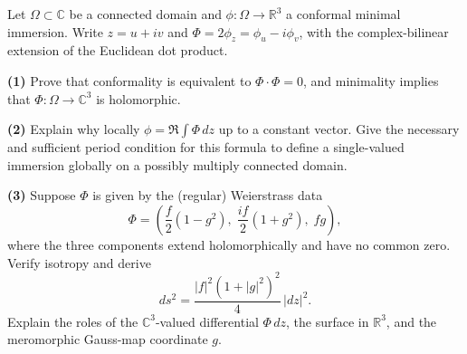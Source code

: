 \begin{problem}[CP-IV-0134]
\label{prob:cp-iv-0134}
Let $\Omega\subset\mathbb C$ be a connected domain and
$\phi:\Omega\to\mathbb R^3$ a conformal minimal immersion.
Write $z=u+iv$ and $\Phi=2\phi_z=\phi_u-i\phi_v$, with the
complex-bilinear extension of the Euclidean dot product.
\par\noindent\textbf{(1)} Prove that conformality is equivalent to
$\Phi\cdot\Phi=0$, and minimality implies that
$\Phi:\Omega\to\mathbb C^3$ is holomorphic.
\par\noindent\textbf{(2)} Explain why locally $\phi=\Re\int\Phi\,dz$ up to a
constant vector. Give the necessary and sufficient period condition
for this formula to define a single-valued immersion globally on a
possibly multiply connected domain.
\par\noindent\textbf{(3)} Suppose $\Phi$ is given by the (regular) Weierstrass data
\[
\Phi=\left(\frac f2(1-g^2),\;\frac{if}2(1+g^2),\;fg\right),
\]
where the three components extend holomorphically and have no common
zero. Verify isotropy and derive
\[
ds^2=\frac{|f|^2(1+|g|^2)^2}{4}\,|dz|^2.
\]
Explain the roles of the $\mathbb C^3$-valued differential $\Phi\,dz$,
the surface in $\mathbb R^3$, and the meromorphic Gauss-map coordinate $g$.
\end{problem}

